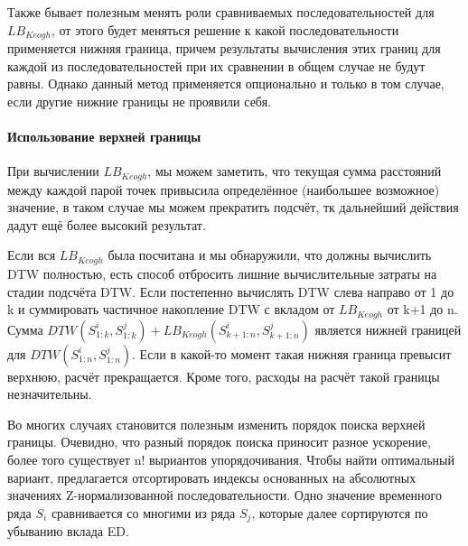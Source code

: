 \documentclass[12pt,twoside]{article}
\begin{document}
        Также бывает полезным менять роли сравниваемых последовательностей для $LB_{Keogh}$,
        от этого будет меняться решение к какой последовательности применяется нижняя граница,
        причем результаты вычисления этих границ для каждой из последовательностей при их сравнении в общем случае не будут равны.
        Однако данный метод применяется опционально и только в том случае, если другие нижние границы не проявили себя.
        
        \paragraph{Использование верхней границы}
        При вычислении $LB_{Keogh}$, мы можем заметить,
        что текущая сумма расстояний между каждой парой точек привысила определённое (наибольшее возможное) значение,
        в таком случае мы можем прекратить подсчёт, тк дальнейший действия дадут ещё более высокий результат.
        
        Если вся $LB_{Keogh}$ была посчитана и мы обнаружили, что должны вычислить DTW полностью,
        есть способ отбросить лишние вычислительные затраты на стадии подсчёта DTW.
        Если постепенно вычислять DTW слева направо от 1 до k и суммировать частичное накопление DTW с вкладом от $LB_{Keogh}$ от k+1 до n.
        Сумма $DTW(S_{1:k}^i, S_{1:k}^j) + LB_{Keogh}(S_{k+1:n}^i, S_{k+1:n}^j)$ является нижней границей для $DTW(S_{1:n}^i, S_{1:n}^j)$.
        Если в какой-то момент такая нижняя граница превысит верхнюю, расчёт прекращается.
        Кроме того, расходы на расчёт такой границы незначительны.
        

        
        Во многих случаях становится полезным изменить порядок поиска верхней границы.
        Очевидно, что разный порядок поиска приносит разное ускорение, более того существует n! выриантов упорядочивания.
        Чтобы найти оптимальный вариант, предлагается отсортировать индексы основанных на абсолютных значениях Z-нормализованной последовательности.
        Одно значение временного ряда $S_i$ сравнивается со многими из ряда $S_j$, которые далее сортируются по убыванию вклада ED. 
        
\end{document}
